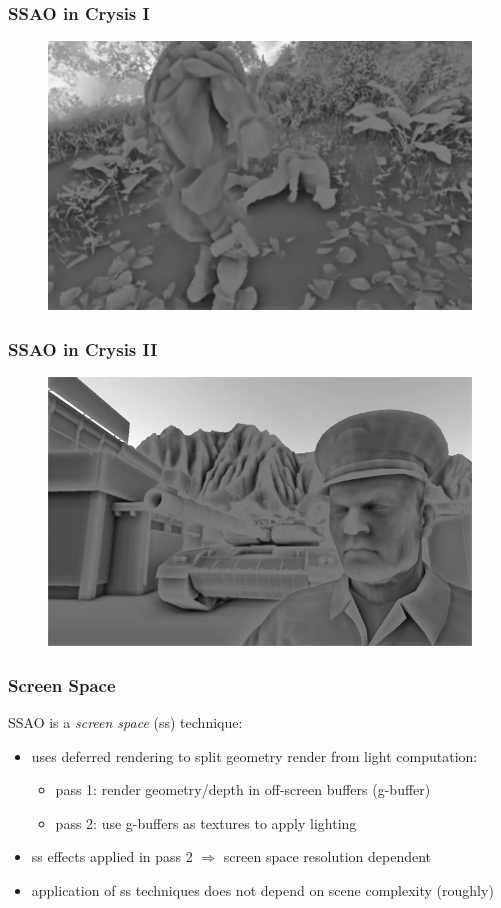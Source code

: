 \documentclass{beamer}
\newcommand{\redtext}[1]{\textcolor{myred}{#1}}
\begin{document}
\begin{frame}
\frametitle{SSAO in Crysis I}
\begin{figure}
    \centering
    \includegraphics[width=0.8\linewidth]{images/ssao_crysis_gameplay.png}
\end{figure}
\end{frame}

\begin{frame}
\frametitle{SSAO in Crysis II}
\begin{figure}
    \centering
    \includegraphics[width=0.8\linewidth]{images/ssao_tank.jpg}
\end{figure}

\end{frame}

\begin{frame}
\frametitle{Screen Space}
SSAO is a \emph{screen space} (ss) technique:
\begin{itemize}
    \item uses \redtext{deferred rendering} to split geometry render from light computation:
    \begin{itemize}
        \item pass 1: \redtext{render geometry/depth} in off-screen buffers (g-buffer)
        \item pass 2: \redtext{use g-buffers} as textures to apply lighting
    \end{itemize}
    \item ss effects applied in pass 2 $ \Rightarrow $ screen space resolution dependent
    \item application of ss techniques does not depend on scene complexity (roughly)
\end{itemize}
\end{frame}
\end{document}
